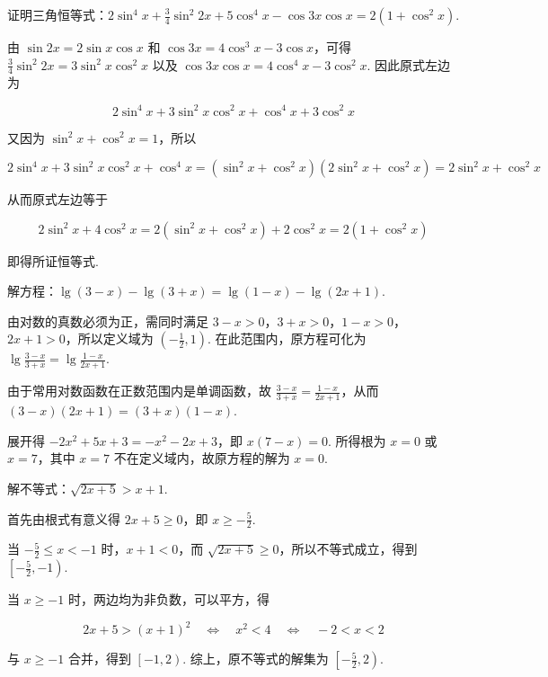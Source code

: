 \begin{problem}

证明三角恒等式：\(2\sin^4 x+\frac{3}{4}\sin^2 2x+5\cos^4 x-\cos 3x\cos x=2(1+\cos^2 x)\).
\end{problem}

\begin{solution}
由 \(\sin 2x=2\sin x\cos x\) 和 \(\cos 3x=4\cos^3x-3\cos x\)，可得 \(\frac{3}{4}\sin^2 2x=3\sin^2x\cos^2x\) 以及 \(\cos 3x\cos x=4\cos^4x-3\cos^2x\). 因此原式左边为

\[
2\sin^4x+3\sin^2x\cos^2x+\cos^4x+3\cos^2x
\]

又因为 \(\sin^2x+\cos^2x=1\)，所以

\[
2\sin^4x+3\sin^2x\cos^2x+\cos^4x
=\left(\sin^2x+\cos^2x\right)\left(2\sin^2x+\cos^2x\right)
=2\sin^2x+\cos^2x
\]

从而原式左边等于

\[
2\sin^2x+4\cos^2x
=2\left(\sin^2x+\cos^2x\right)+2\cos^2x
=2\left(1+\cos^2x\right)
\]

即得所证恒等式.
\end{solution}

\begin{problem}

解方程：\(\lg (3-x)-\lg (3+x)=\lg (1-x)-\lg (2x+1)\).
\end{problem}

\begin{solution}
由对数的真数必须为正，需同时满足 \(3-x>0\)，\(3+x>0\)，\(1-x>0\)，\(2x+1>0\)，所以定义域为 \(\left(-\frac{1}{2},1\right)\). 在此范围内，原方程可化为
\(\lg\frac{3-x}{3+x}=\lg\frac{1-x}{2x+1}\).

由于常用对数函数在正数范围内是单调函数，故
\(\frac{3-x}{3+x}=\frac{1-x}{2x+1}\)，从而
\(\left(3-x\right)\left(2x+1\right)=\left(3+x\right)\left(1-x\right)\).

展开得 \(-2x^2+5x+3=-x^2-2x+3\)，即 \(x\left(7-x\right)=0\). 所得根为 \(x=0\) 或 \(x=7\)，其中 \(x=7\) 不在定义域内，故原方程的解为 \(x=0\).
\end{solution}

\begin{problem}

解不等式：\(\sqrt{2x+5}>x+1\).
\end{problem}

\begin{solution}
首先由根式有意义得 \(2x+5\geqslant0\)，即 \(x\geqslant-\frac{5}{2}\).

当 \(-\frac{5}{2}\leqslant x<-1\) 时，\(x+1<0\)，而 \(\sqrt{2x+5}\geqslant0\)，所以不等式成立，得到 \(\left[-\frac{5}{2},-1\right)\).

当 \(x\geqslant-1\) 时，两边均为非负数，可以平方，得

\[
2x+5>\left(x+1\right)^2
\quad\Longleftrightarrow\quad
x^2<4
\quad\Longleftrightarrow\quad
-2<x<2
\]

与 \(x\geqslant-1\) 合并，得到 \(\left[-1,2\right)\). 综上，原不等式的解集为 \(\left[-\frac{5}{2},2\right)\).
\end{solution}

